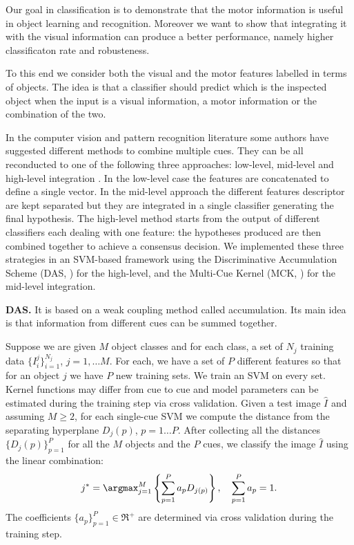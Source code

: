 Our goal in classification is to demonstrate that the motor information is
useful in object learning and recognition. Moreover we want 
to show that integrating it with the visual information can 
produce a better performance, namely higher classificaton 
rate and robusteness.

To this end we consider both the visual and the motor features
labelled in terms of objects. The idea is that a classifier 
should predict which is the inspected object when the input is
a visual information, a motor information or the combination 
of the two.

In the computer vision and pattern recognition literature 
some authors have suggested different methods to combine
multiple cues. They can be all reconducted to one of the 
following three approaches: low-level, mid-level and high-level
integration \cite{Polikar2006,sanderson2004}. 
In the low-level case the features are concatenated
to define a single vector. In the mid-level approach
the different features descriptor are kept separated 
but they are integrated in a single classifier generating the
final hypothesis. The high-level method starts from
the output of different classifiers each dealing with one feature: 
the hypotheses produced are then combined together to
achieve a consensus decision.
We implemented these three strategies in an SVM-based framework
using the Discriminative Accumulation Scheme (DAS, \cite{DAS}) for
the high-level, and the Multi-Cue Kernel (MCK, \cite{MCK}) for the
mid-level integration.

\vspace{0.5cm}

\noindent\textbf{DAS.} It is based on a weak coupling method called accumulation. Its main 
idea is that information from different cues can be summed together.

Suppose we are given $M$ object classes and for each class, a set
of $N_{j}$ training data $\{I^{j}_{i}\}_{i=1}^{N_{j}}$,
$j=1,\ldots M$. For each, we have a set of $P$ different
features so that for an object $j$ we have $P$ new training sets.
We train an SVM on every set. Kernel functions may differ from cue to
cue and model parameters can be estimated during the training step
via cross validation. Given a test image $\hat{I}$ and assuming
$M\geq2$, for each single-cue SVM we compute the distance from the
separating hyperplane $D_{j}(p)$, $p=1\ldots P$.
After collecting all the distances $\{D_{j}(p)\}_{p=1}^{P}$ for
all the $M$ objects  and the $P$ cues, we classify the image
$\hat{I}$ using the linear combination:
\begin{equation}
j^{*}=\argmax_{j=1}^{M} \left \{\sum_{p=1}^{P}a_{p}D_{j(p)} \right \}, \quad
\sum_{p=1}^{P}a_{p}=1. \label{eq:DAS}
\end{equation}
The coefficients $\{a_{p}\}_{p=1}^{P}\in \Re^{+}$ are determined
via cross validation during the training step.

